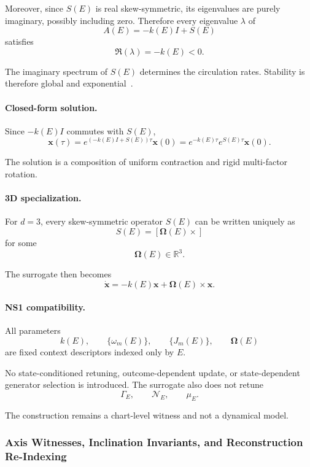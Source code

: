 \documentclass[aps,prx,onecolumn,11pt]{revtex4-2}
\theoremstyle{plain}
\theoremstyle{definition}
\theoremstyle{remark}
\begin{document}
Moreover, since \(S(E)\) is real skew-symmetric, its eigenvalues are
purely imaginary, possibly including zero. Therefore every eigenvalue
\(\lambda\) of
\[
A(E)=-k(E)I+S(E)
\]
satisfies
\[
\Re(\lambda)=-k(E)<0.
\]

The imaginary spectrum of \(S(E)\) determines the circulation rates.
Stability is therefore global and exponential~\cite{Khalil2002}.

\paragraph{Closed-form solution.}

Since \(-k(E)I\) commutes with \(S(E)\),
\[
\mathbf{x}(\tau)
=
e^{(-k(E)I+S(E))\tau}
\mathbf{x}(0)
=
e^{-k(E)\tau}
e^{S(E)\tau}
\mathbf{x}(0).
\]

The solution is a composition of uniform contraction and rigid
multi-factor rotation.

\paragraph{3D specialization.}

For \(d=3\), every skew-symmetric operator \(S(E)\) can be written
uniquely as
\[
S(E)
=
[\boldsymbol{\Omega}(E)\times]
\]
for some
\[
\boldsymbol{\Omega}(E)\in\mathbb R^3.
\]

The surrogate then becomes
\begin{equation}
\dot{\mathbf{x}}
=
-k(E)\mathbf{x}
+
\boldsymbol{\Omega}(E)\times\mathbf{x}.
\label{eq:toy_basin_flow}
\end{equation}

\paragraph{NS1 compatibility.}

All parameters
\[
k(E),
\qquad
\{\omega_m(E)\},
\qquad
\{J_m(E)\},
\qquad
\boldsymbol{\Omega}(E)
\]
are fixed context descriptors indexed only by \(E\).

No state-conditioned retuning, outcome-dependent update, or
state-dependent generator selection is introduced. The surrogate also
does not retune
\[
\Gamma_E,
\qquad
\mathcal N_E,
\qquad
\mu_E.
\]

The construction remains a chart-level witness and not a dynamical
model.

\subsubsection{Axis Witnesses, Inclination Invariants, and Reconstruction Re-Indexing}
\label{toy:spin_proxy:axis_precession}
\end{document}
